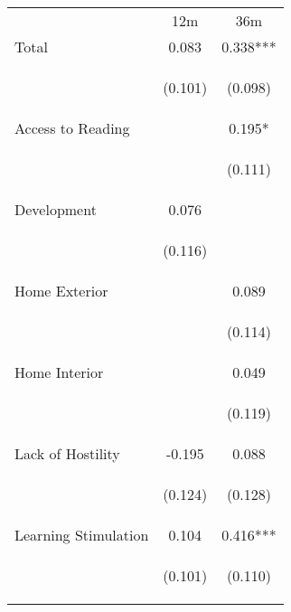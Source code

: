 \begin{tabular}{lcc}
\hline \noalign{\smallskip} & 12m & 36m\\
\noalign{\smallskip}\hline \noalign{\smallskip}Total & 0.083 & 0.338***\\
 & \begin{footnotesize}(0.101)\end{footnotesize} & \begin{footnotesize}(0.098)\end{footnotesize}\\
\noalign{\smallskip}Access to Reading &  & 0.195*\\
 & \begin{footnotesize}\end{footnotesize} & \begin{footnotesize}(0.111)\end{footnotesize}\\
\noalign{\smallskip}Development & 0.076 & \\
 & \begin{footnotesize}(0.116)\end{footnotesize} & \begin{footnotesize}\end{footnotesize}\\
\noalign{\smallskip}Home Exterior &  & 0.089\\
 & \begin{footnotesize}\end{footnotesize} & \begin{footnotesize}(0.114)\end{footnotesize}\\
\noalign{\smallskip}Home Interior &  & 0.049\\
 & \begin{footnotesize}\end{footnotesize} & \begin{footnotesize}(0.119)\end{footnotesize}\\
\noalign{\smallskip}Lack of Hostility & -0.195 & 0.088\\
 & \begin{footnotesize}(0.124)\end{footnotesize} & \begin{footnotesize}(0.128)\end{footnotesize}\\
\noalign{\smallskip}Learning Stimulation & 0.104 & 0.416***\\
 & \begin{footnotesize}(0.101)\end{footnotesize} & \begin{footnotesize}(0.110)\end{footnotesize}\\

\end{tabular}
